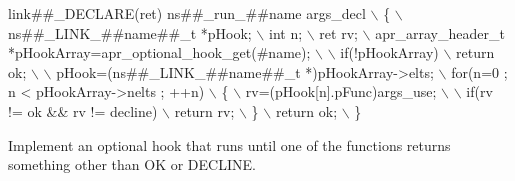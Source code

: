 \begin{DoxyCode}
link##\_DECLARE(ret) ns\textcolor{preprocessor}{##\_run\_##name args\_decl \(\backslash\)}
\textcolor{preprocessor}{    \{ \(\backslash\)}
\textcolor{preprocessor}{    ns##\_LINK\_##name##\_t *pHook; \(\backslash\)}
\textcolor{preprocessor}{    int n; \(\backslash\)}
\textcolor{preprocessor}{    ret rv; \(\backslash\)}
\textcolor{preprocessor}{    apr\_array\_header\_t *pHookArray=apr\_optional\_hook\_get(#name); \(\backslash\)}
\textcolor{preprocessor}{\(\backslash\)}
\textcolor{preprocessor}{    if(!pHookArray) \(\backslash\)}
\textcolor{preprocessor}{    return ok; \(\backslash\)}
\textcolor{preprocessor}{\(\backslash\)}
\textcolor{preprocessor}{    pHook=(ns##\_LINK\_##name##\_t *)pHookArray->elts; \(\backslash\)}
\textcolor{preprocessor}{    for(n=0 ; n < pHookArray->nelts ; ++n) \(\backslash\)}
\textcolor{preprocessor}{    \{ \(\backslash\)}
\textcolor{preprocessor}{    rv=(pHook[n].pFunc)args\_use; \(\backslash\)}
\textcolor{preprocessor}{\(\backslash\)}
\textcolor{preprocessor}{    if(rv != ok && rv != decline) \(\backslash\)}
\textcolor{preprocessor}{        return rv; \(\backslash\)}
\textcolor{preprocessor}{    \} \(\backslash\)}
\textcolor{preprocessor}{    return ok; \(\backslash\)}
\textcolor{preprocessor}{    \}}
\end{DoxyCode}
Implement an optional hook that runs until one of the functions returns something other than O\-K or D\-E\-C\-L\-I\-N\-E.


